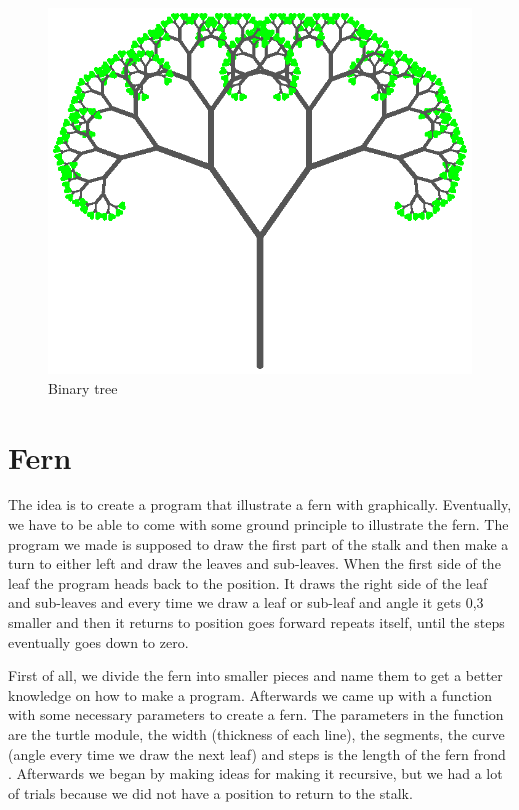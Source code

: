\documentclass[titlepage]{article}
\begin{document}
\begin{figure}[H]
  \centering
  \includegraphics{bintree}
  \caption{Binary tree}
\end{figure}

\section{Fern}
The idea is to create a program that illustrate a fern with graphically. Eventually, we have to be able to come with some ground principle to illustrate the fern. The program we made is supposed to draw the first part of the stalk and then make a turn to either left and draw the leaves and sub-leaves. When the first side of the leaf the program heads back to the position. It draws the right side of the leaf and sub-leaves and every time we draw a leaf or sub-leaf and angle it gets 0,3 smaller and then it returns to position goes forward repeats itself, until the steps eventually goes down to zero.

First of all, we divide the fern into smaller pieces and name them to get a better knowledge on how to make a program. Afterwards we came up with a function with some necessary parameters to create a fern. The parameters in the function are the turtle module, the width (thickness of each line), the segments, the curve (angle every time we draw the next leaf) and steps is the length of the fern frond . Afterwards we began by making ideas for making it recursive, but we had a lot of trials because we did not have a position to return to the stalk.\par
\end{document}
